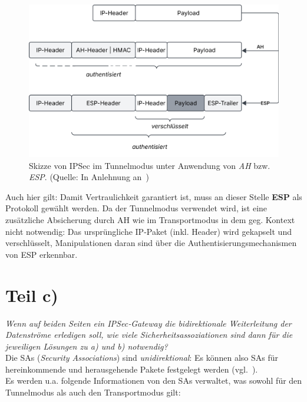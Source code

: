 \begin{figure}
    \centering
    \includegraphics[scale=0.4]{aufgabe 3/img/tunnelmodus.svg}
    \caption{Skizze von IPSec im Tunnelmodus unter Anwendung von \textit{AH} bzw. \textit{ESP}. (Quelle: In Anlehnung an~\cite[\textbf{Abb. 3.6}, 41]{ITS4})}
    \label{fig:tunnelmodus}
\end{figure}

\noindent
Auch hier gilt: Damit Vertraulichkeit garantiert ist, muss an dieser Stelle \textbf{ESP} als Protokoll gewählt werden.
Da der Tunnelmodus verwendet wird, ist eine zusätzliche Absicherung durch AH wie im Transportmodus in dem geg.
Kontext nicht notwendig: Das ursprüngliche IP-Paket (inkl. Header) wird gekapselt und verschlüsselt, Manipulationen daran sind über die Authentisierungsmechanismen von ESP erkennbar.

\section{Teil c)}

\textit{Wenn auf beiden Seiten ein IPSec‐Gateway die bidirektionale Weiterleitung der
Datenströme erledigen soll, wie viele Sicherheitsassoziationen sind dann für die
jeweiligen Lösungen zu a) und b) notwendig?}\\

\noindent
Die SAs (\textit{Security Associations}) sind \textit{unidirektional}: Es können also SAs für hereinkommende und herausgehende Pakete festgelegt werden (vgl.~\cite[773]{Eck18}).\\

\noindent
Es werden u.a. folgende Informationen von den SAs verwaltet, was sowohl für den Tunnelmodus als auch den Transportmodus  gilt:

